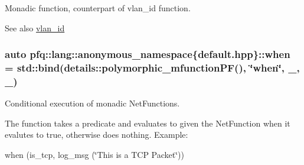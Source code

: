 Monadic function, counterpart of {\ttfamily vlan\+\_\+id} function. 

\begin{DoxySeeAlso}{See also}
\hyperlink{namespacepfq_1_1lang_1_1anonymous__namespace_02default_8hpp_03_ad2a631020f34bf10335ebb0e79f03920}{vlan\+\_\+id} 
\end{DoxySeeAlso}
\hypertarget{namespacepfq_1_1lang_1_1anonymous__namespace_02default_8hpp_03_a22ae8d6c01ae06cdfa698cf9198d292b}{
\subsubsection[{when}]{\setlength{\rightskip}{0pt plus 5cm}auto pfq\+::lang\+::anonymous\+\_\+namespace\{default.\+hpp\}\+::when = std\+::bind(details\+::polymorphic\+\_\+mfunction\+P\+F(), \char`\"{}when\char`\"{}, \+\_, \+\_)}}\label{namespacepfq_1_1lang_1_1anonymous__namespace_02default_8hpp_03_a22ae8d6c01ae06cdfa698cf9198d292b}


Conditional execution of monadic Net\+Functions. 

The function takes a predicate and evaluates to given the Net\+Function when it evalutes to {\ttfamily true}, otherwise does nothing. Example\+:

when (is\+\_\+tcp, log\+\_\+msg (\char`\"{}\+This is a T\+C\+P Packet\char`\"{})) 